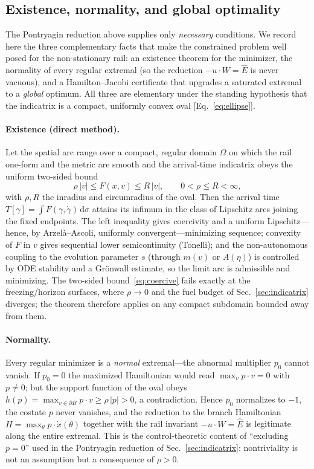 \documentclass[12pt]{iopart}
\newcommand{\Ehat}{\hat E}
\newcommand{\dd}{\mathrm{d}}
\begin{document}
\subsection{Existence, normality, and global optimality}
\label{sec:control-foundations}
The Pontryagin reduction above supplies only \emph{necessary} conditions. We
record here the three complementary facts that make the constrained problem well
posed for the non-stationary rail: an existence theorem for the minimizer, the
normality of every regular extremal (so the reduction $-u\cdot W=\Ehat$ is never
vacuous), and a Hamilton--Jacobi certificate that upgrades a saturated extremal to
a \emph{global} optimum. All three are elementary under the standing hypothesis
that the indicatrix is a compact, uniformly convex oval [Eq.~\eqref{eq:ellipse}].

\paragraph{Existence (direct method).} Let the spatial arc range over a compact,
regular domain $\Omega$ on which the rail one-form and the metric are smooth and
the arrival-time indicatrix obeys the uniform two-sided bound
\begin{equation}
  \rho\,|v| \le F(x,v) \le R\,|v|, \qquad 0<\rho\le R<\infty,
  \label{eq:coercive}
\end{equation}
with $\rho,R$ the inradius and circumradius of the oval. Then the arrival time
$T[\gamma]=\int F(\gamma,\dot\gamma)\,\dd\sigma$ attains its infimum in the class
of Lipschitz arcs joining the fixed endpoints. The left inequality gives
coercivity and a uniform Lipschitz---hence, by Arzel\`a--Ascoli, uniformly
convergent---minimizing sequence; convexity of $F$ in $v$ gives sequential lower
semicontinuity (Tonelli); and the non-autonomous coupling to the evolution
parameter $s$ (through $m(v)$ or $A(\eta)$) is controlled by ODE stability and a
Gr\"onwall estimate, so the limit arc is admissible and minimizing. The two-sided
bound~\eqref{eq:coercive} fails exactly at the freezing/horizon surfaces, where
$\rho\to0$ and the fuel budget of Sec.~\ref{sec:indicatrix} diverges; the theorem
therefore applies on any compact subdomain bounded away from them.

\paragraph{Normality.} Every regular minimizer is a \emph{normal} extremal---the
abnormal multiplier $p_0$ cannot vanish. If $p_0=0$ the maximized Hamiltonian
would read $\max_v p\cdot v=0$ with $p\neq0$; but the support function of the oval
obeys $h(p)=\max_{v\in\partial B}p\cdot v\ge\rho\,|p|>0$, a contradiction. Hence
$p_0$ normalizes to $-1$, the costate $p$ never vanishes, and the reduction to the
branch Hamiltonian $H=\max_\theta p\cdot\dot x(\theta)$ together with the rail
invariant $-u\cdot W=\Ehat$ is legitimate along the entire extremal. This is the
control-theoretic content of ``excluding $p=0$'' used in the Pontryagin reduction
of Sec.~\ref{sec:indicatrix}: nontriviality is not an assumption but a consequence
of $\rho>0$.
\end{document}
